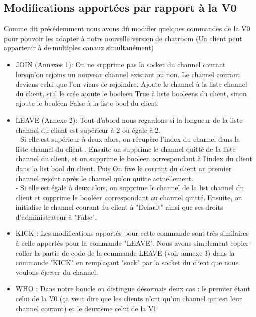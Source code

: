 \documentclass[12pt]{article}
\begin{document}
\subsection{Modifications apportées par rapport à la V0}
Comme dit précédemment nous avons dû modifier quelques commandes de la V0 pour pouvoir les adapter à notre nouvelle version de chatroom (Un client peut appartenir à de multiples canaux simultanément)\\

\begin{itemize}
    \item JOIN (Annexes 1):  On ne supprime pas la socket du channel courant lorsqu'on rejoins un nouveau channel existant ou non. 
    Le channel courant deviens celui que l'on viens de rejoindre. Ajoute le channel à la liste channel du client, si il le crée ajoute le booleen True à liste booleens du client,
    sinon ajoute le booléen False à la liste bool du client.\\
    \item LEAVE (Annexe 2): Tout d'abord nous regardons si la longueur de la liste channel du client est supérieur à 2 ou égale à 2.\\
     - Si elle est supérieur à deux alors, on récupère l'index du channel dans la liste channel du client . 
    Ensuite on supprime le channel quitté de la liste channel du client, et on supprime le booleen correspondant à l'index du client dans la list bool du client.
    Puis  On fixe le courant du client au premier channel rejoint après le channel qu'on quitte actuellement. \\
     - Si  elle est égale à deux alors, on supprime le channel de la list channel du client et supprime le booléen correspondant au channel quitté.
     Ensuite, on initialise le channel courant du client à "Default" ainsi que ses droits d'administrateur à "False".\\ 
    \item KICK : Les modifications apportés pour cette commande sont très similaires à celle apportés pour la commande "LEAVE". Nous avons simplement copier-coller 
    la partie de code de la commande LEAVE (voir annexe 3) dans la commande "KICK" en remplaçant "sock" par la socket du client que nous voulons éjecter du channel.\\
    \item WHO : Dans notre boucle on distingue désormais deux cas : le premier étant celui de la V0 (ça veut dire que les clients n'ont qu'un channel qui est leur channel courant) et le deuxième celui de la V1

\end{itemize}
\end{document}
